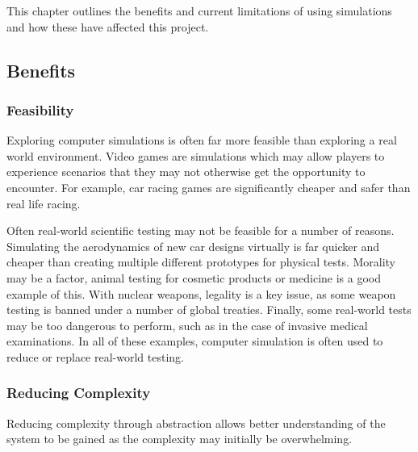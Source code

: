 \documentclass{UoYCSproject}
\begin{document}

This chapter outlines the benefits and current limitations of using simulations and how these have affected this project.

\subsection{Benefits}
\subsubsection{Feasibility}
Exploring computer simulations is often far more feasible than exploring a real world environment. Video games are simulations which may allow players to experience scenarios that they may not otherwise get the opportunity to encounter. For example, car racing games are significantly cheaper and safer than real life racing.

Often real-world scientific testing may not be feasible for a number of reasons. Simulating the aerodynamics of new car designs virtually is far quicker and cheaper than creating multiple different prototypes for physical tests. Morality may be a factor, animal testing for cosmetic products or medicine is a good example of this. With nuclear weapons, legality is a key issue, as some weapon testing is banned under a number of global treaties\cite{partial_nuclear_test_ban_treaty, threshold_test_ban_treaty}. Finally, some real-world tests may be too dangerous to perform, such as in the case of invasive medical examinations. %
In all of these examples, computer simulation is often used to reduce or replace real-world testing.


\subsubsection{Reducing Complexity}
Reducing complexity through abstraction allows better understanding of the system to be gained as the complexity may initially be overwhelming.
\end{document}
